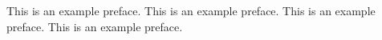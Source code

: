 This is an example preface.
This is an example preface.
This is an example preface.
This is an example preface.

